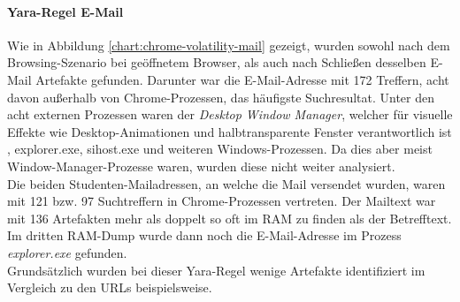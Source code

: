 \paragraph*{Yara-Regel \glqq{}E-Mail\grqq{}}\label{chap:ergebnisse-chrome-uncommon-volatility-email}
Wie in Abbildung \ref{chart:chrome-volatility-mail} gezeigt, wurden sowohl nach dem Browsing-Szenario bei geöffnetem Browser, als auch nach Schließen desselben E-Mail Artefakte gefunden. Darunter war die E-Mail-Adresse mit 172 Treffern, acht davon außerhalb von Chrome-Prozessen, das häufigste Suchresultat. Unter den acht externen Prozessen waren der \textit{Desktop Window Manager}, welcher für visuelle Effekte wie Desktop-Animationen und halbtransparente Fenster verantwortlich ist \cite{dwmWebsite}, explorer.exe, sihost.exe und weiteren Windows-Prozessen. Da dies aber meist Window-Manager-Prozesse waren, wurden diese nicht weiter analysiert. \\
Die beiden Studenten-Mailadressen, an welche die Mail versendet wurden, waren mit 121 bzw. 97 Suchtreffern in Chrome-Prozessen vertreten. Der Mailtext war mit 136 Artefakten mehr als doppelt so oft im RAM zu finden als der Betrefftext. Im dritten RAM-Dump wurde dann noch die E-Mail-Adresse im Prozess \textit{explorer.exe} gefunden.\\
Grundsätzlich wurden bei dieser Yara-Regel wenige Artefakte identifiziert im Vergleich zu den URLs beispielsweise.


